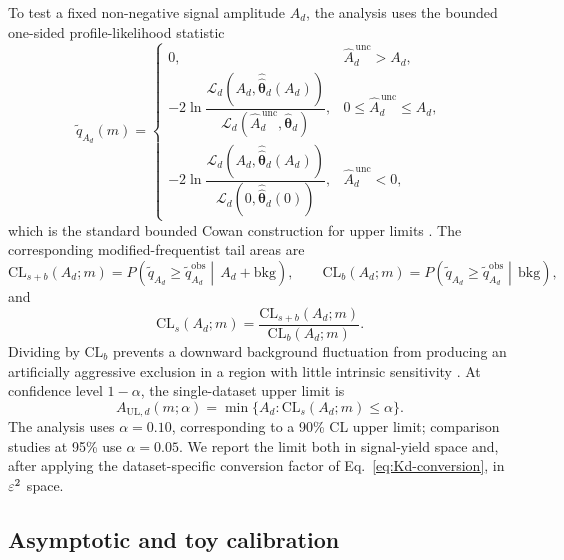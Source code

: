 To test a fixed non-negative signal amplitude $A_d$, the analysis uses
the bounded one-sided profile-likelihood statistic
\begin{equation}
\tilde q_{A_d}(m)=
\begin{cases}
0, &
\hat A_d^{\,\mathrm{unc}} > A_d, \\
-2\ln
\dfrac{\mathcal{L}_d\!\left(A_d,\hat{\hat{\bm{\theta}}}_d(A_d)\right)}
{\mathcal{L}_d\!\left(\hat A_d^{\,\mathrm{unc}},\hat{\bm{\theta}}_d\right)}, &
0\le \hat A_d^{\,\mathrm{unc}}\le A_d, \\
-2\ln
\dfrac{\mathcal{L}_d\!\left(A_d,\hat{\hat{\bm{\theta}}}_d(A_d)\right)}
{\mathcal{L}_d\!\left(0,\hat{\hat{\bm{\theta}}}_d(0)\right)}, &
\hat A_d^{\,\mathrm{unc}} < 0,
\end{cases}
\label{eq:qmu-single}
\end{equation}
which is the standard bounded Cowan construction for upper limits \cite{Cowan2011}.
The corresponding modified-frequentist tail areas are
\begin{equation}
\mathrm{CL}_{s+b}(A_d;m)
=
P\!\left(
\tilde q_{A_d}\ge \tilde q_{A_d}^{\mathrm{obs}}
\middle|\,
A_d+\mathrm{bkg}
\right),
\qquad
\mathrm{CL}_{b}(A_d;m)
=
P\!\left(
\tilde q_{A_d}\ge \tilde q_{A_d}^{\mathrm{obs}}
\middle|\,
\mathrm{bkg}
\right),
\end{equation}
and
\begin{equation}
\mathrm{CL}_{s}(A_d;m)=
\frac{\mathrm{CL}_{s+b}(A_d;m)}{\mathrm{CL}_{b}(A_d;m)}.
\label{eq:cls-definition}
\end{equation}
Dividing by $\mathrm{CL}_b$ prevents a downward background fluctuation from producing
an artificially aggressive exclusion in a region with little intrinsic sensitivity
\cite{Junk1999,Read2002}. At confidence level $1-\alpha$, the single-dataset upper
limit is
\begin{equation}
A_{\mathrm{UL},d}(m;\alpha)
=\min\{A_d:\mathrm{CL}_s(A_d;m)\le\alpha\}.
\label{eq:aul-single}
\end{equation}
The analysis uses $\alpha=0.10$, corresponding to a 90\% CL upper limit; comparison
studies at 95\% use $\alpha=0.05$. We report the limit both in
signal-yield space and, after applying the dataset-specific conversion factor of
Eq.~\eqref{eq:Kd-conversion}, in $\varepsilon^2$ space.

\subsection{Asymptotic and toy calibration}

